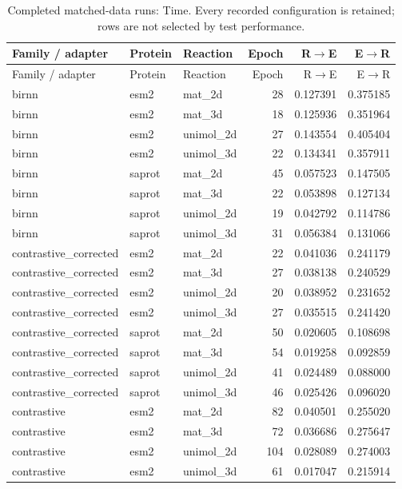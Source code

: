 \begin{longtable}{p{.32\linewidth}llrrr}
\caption{Completed matched-data runs: Time. Every recorded configuration is retained; rows are not selected by test performance.}\label{tab:exp-all-time}\\
\toprule
Family / adapter & Protein & Reaction & Epoch & R$\to$E & E$\to$R \\
\midrule\endfirsthead
\toprule
Family / adapter & Protein & Reaction & Epoch & R$\to$E & E$\to$R \\
\midrule\endhead
\bottomrule\endfoot
birnn & esm2 & mat\_2d & 28 & 0.127391 & 0.375185 \\
birnn & esm2 & mat\_3d & 18 & 0.125936 & 0.351964 \\
birnn & esm2 & unimol\_2d & 27 & 0.143554 & 0.405404 \\
birnn & esm2 & unimol\_3d & 22 & 0.134341 & 0.357911 \\
birnn & saprot & mat\_2d & 45 & 0.057523 & 0.147505 \\
birnn & saprot & mat\_3d & 22 & 0.053898 & 0.127134 \\
birnn & saprot & unimol\_2d & 19 & 0.042792 & 0.114786 \\
birnn & saprot & unimol\_3d & 31 & 0.056384 & 0.131066 \\
contrastive\_corrected & esm2 & mat\_2d & 22 & 0.041036 & 0.241179 \\
contrastive\_corrected & esm2 & mat\_3d & 27 & 0.038138 & 0.240529 \\
contrastive\_corrected & esm2 & unimol\_2d & 20 & 0.038952 & 0.231652 \\
contrastive\_corrected & esm2 & unimol\_3d & 27 & 0.035515 & 0.241420 \\
contrastive\_corrected & saprot & mat\_2d & 50 & 0.020605 & 0.108698 \\
contrastive\_corrected & saprot & mat\_3d & 54 & 0.019258 & 0.092859 \\
contrastive\_corrected & saprot & unimol\_2d & 41 & 0.024489 & 0.088000 \\
contrastive\_corrected & saprot & unimol\_3d & 46 & 0.025426 & 0.096020 \\
contrastive & esm2 & mat\_2d & 82 & 0.040501 & 0.255020 \\
contrastive & esm2 & mat\_3d & 72 & 0.036686 & 0.275647 \\
contrastive & esm2 & unimol\_2d & 104 & 0.028089 & 0.274003 \\
contrastive & esm2 & unimol\_3d & 61 & 0.017047 & 0.215914 \\

\end{longtable}
